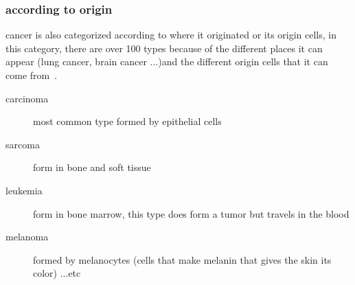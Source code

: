             \subsubsection{according to origin}
            cancer is also categorized according to where it originated or its origin cells, in this category, there are over 100 types because of the different places it can appear (lung cancer, brain cancer ...)and the different origin cells that it can come from~\cite{whatiscancer2021}.
            \begin{description}
                \item[carcinoma]
                most common type formed by epithelial cells 
                \item[sarcoma]
                form in bone and soft tissue
                \item[leukemia]
                form in bone marrow, this type does form a tumor but travels in the blood 
                \item[melanoma]
                formed by melanocytes (cells that make melanin that gives the skin its color)
                ...etc
            \end{description}
